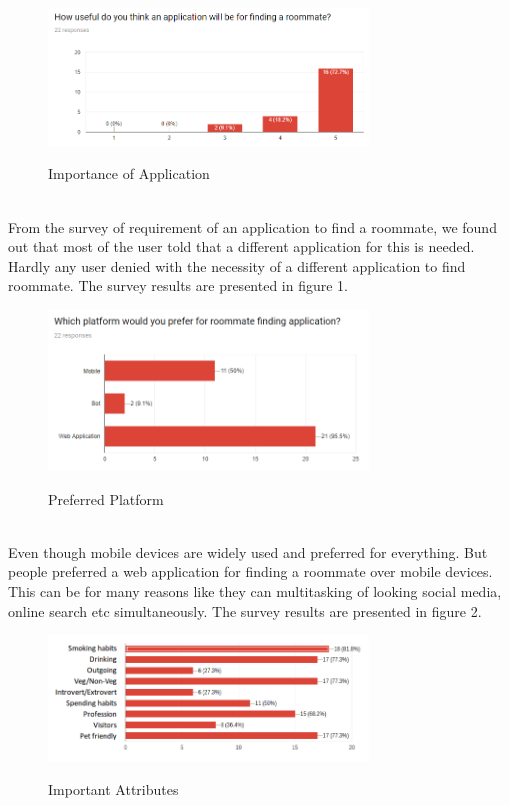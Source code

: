 \documentclass{sig-alternate-05-2015}
\begin{document}
\begin{figure}[h]
\centering
\includegraphics[width=8.5cm]{1.png}\\
\caption{Importance of Application}
\end{figure}
\\
From the survey of requirement of an application to find a roommate, we found out that most of the user told that a different application for this is needed. Hardly any user denied with the necessity of a different application to find roommate. The survey results are presented in figure 1.
\\
\begin{figure}[h]
\centering
\includegraphics[width=8.5cm]{2.PNG}\\
\caption{Preferred Platform}
\end{figure}
\\
Even though mobile devices are widely used and preferred for everything. But people preferred a web application for finding a roommate over mobile devices. This can be for many reasons like they can multitasking of looking social media, online search etc simultaneously. The survey results are presented in figure 2.
\\
\begin{figure}[h]
\centering
\includegraphics[width=8.5cm]{3.PNG}\\
\caption{Important Attributes}
\end{figure}
\end{document}
